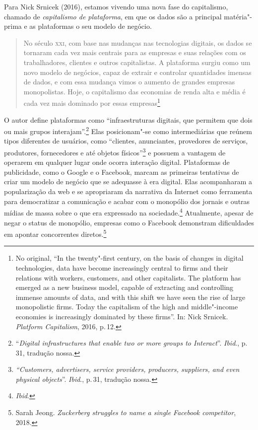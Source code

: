 Para Nick Srnicek (2016), estamos vivendo uma nova fase do capitalismo,
chamado de \textit{capitalismo de plataforma}, em que os dados são a
principal matéria"-prima e as plataformas o seu modelo de negócio.

\begin{quote}
No século \textsc{xxi}, com base nas mudanças nas tecnologias digitais, os dados
se tornaram cada vez mais centrais para as empresas e suas relações com
os trabalhadores, clientes e outros capitalistas. A plataforma surgiu
como um novo modelo de negócios, capaz de extrair e controlar
quantidades imensas de dados, e com essa mudança vimos o aumento de
grandes empresas monopolistas. Hoje, o capitalismo das economias de
renda alta e média é cada vez mais dominado por essas empresas\footnote{No original, ``In
  the twenty"-first century, on the basis of changes in digital
  technologies, data have become increasingly central to firms and their
  relations with workers, customers, and other capitalists. The platform
  has emerged as a new business model, capable of extracting and
  controlling immense amounts of data, and with this shift we have seen
  the rise of large monopolistic firms. Today the capitalism of the high
  and middle"-income economies is increasingly dominated by these
  firms''. In: Nick Srnicek. \emph{Platform Capitalism}, 2016, p.\,12.}
\end{quote}

O autor define plataformas como ``infraestruturas digitais, que permitem
que dois ou mais grupos interajam''.\footnote{``\emph{Digital infrastructures
  that enable two or more groups to Interact}''. \textit{Ibid}., p.\,31, tradução
nossa.} Elas posicionam"-se como intermediárias que reúnem tipos
diferentes de usuários, como ``clientes, anunciantes, provedores de
serviços, produtores, fornecedores e até objetos físicos''\footnote{\emph{``Customers,
  advertisers, service providers, producers, suppliers, and even
  physical objects}''. \textit{Ibid}., p.\,31, tradução nossa.} e possuem a vantagem
de operarem em qualquer lugar onde ocorra interação digital. Plataformas
de publicidade, como o Google e o Facebook, marcam as primeiras
tentativas de criar um modelo de negócio que se adequasse à era digital.
Elas acompanharam a popularização da web e se apropriaram da narrativa
da Internet como ferramenta para democratizar a comunicação e acabar com
o monopólio dos jornais e outras mídias de massa sobre o que era
expressado na sociedade.\footnote{\textit{Ibid}.} Atualmente, apesar de negar o
status de monopólio, empresas como o Facebook demonstram dificuldades em
apontar concorrentes diretos.\footnote{Sarah Jeong. \emph{Zuckerberg struggles to name a single Facebook competitor}, 2018.}

